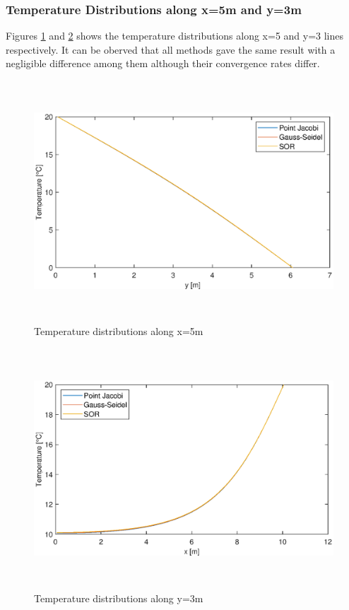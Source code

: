 \documentclass[letterpaper,12pt]{article}
\begin{document}
\subsubsection{Temperature Distributions along x=5m and y=3m}
Figures \ref{fig:x5norad} and \ref{fig:y3norad} shows the temperature distributions along
x=5 and y=3 lines respectively. It can be oberved that all methods gave the same result with
a negligible difference among them although their convergence rates differ.  
\begin{figure}[H] 
	\centering 
	\includegraphics[max height=9cm]{graphs/x5_SOR19_norad.eps}
	\caption{Temperature distributions along x=5m}
 	\label{fig:x5norad}
\end{figure}
\begin{figure}[H] 
	\centering 
	\includegraphics[max height=9cm]{graphs/y3_SOR19_norad.eps}
	\caption{Temperature distributions along y=3m}
 	\label{fig:y3norad}
\end{figure}
\end{document}
